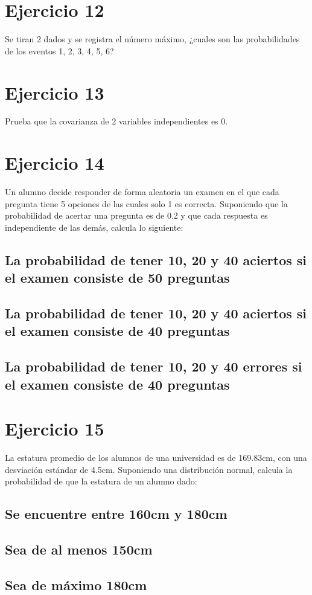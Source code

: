 \documentclass[12pt]{article}
\begin{document}
\section{Ejercicio 12}
Se tiran 2 dados y se registra el número máximo, ¿cuales son las probabilidades de los eventos
1, 2, 3, 4, 5, 6?
\section{Ejercicio 13}
 Prueba que la covarianza de 2 variables independientes es 0.
\section{Ejercicio 14}
 Un alumno decide responder de forma aleatoria un examen en el que cada pregunta tiene
5 opciones de las cuales solo 1 es correcta. Suponiendo que la probabilidad de acertar una
pregunta es de 0.2 y que cada respuesta es independiente de las demás, calcula lo siguiente:\\
\subsection{La probabilidad de tener 10, 20 y 40 aciertos si el examen consiste de 50 preguntas}
\subsection{La probabilidad de tener 10, 20 y 40 aciertos si el examen consiste de 40 preguntas}
\subsection{La probabilidad de tener 10, 20 y 40 errores si el examen consiste de 40 preguntas}
\section{Ejercicio 15}
La estatura promedio de los alumnos de una universidad es de 169.83cm, con una desviación
estándar de 4.5cm. Suponiendo una distribución normal, calcula la probabilidad de que la
estatura de un alumno dado:
\subsection{Se encuentre entre 160cm y 180cm}
\subsection{Sea de al menos 150cm}
\subsection{Sea de máximo 180cm}
\end{document}
